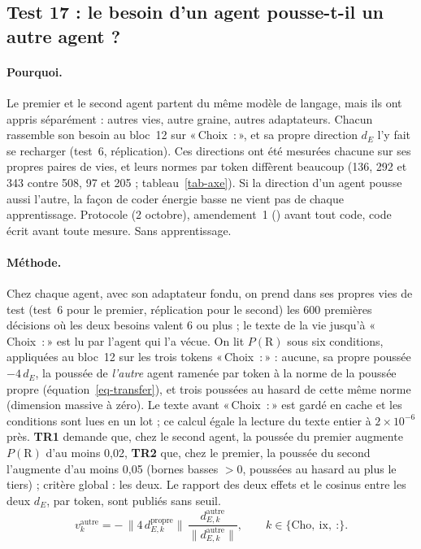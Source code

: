 \documentclass[11pt,a4paper]{article}
\newcommand{\Choix}{«\,Choix~:\,»}
\newcommand{\dE}{d_{E}}
\newcommand{\code}[1]{\texttt{\detokenize{#1}}}
\begin{document}
\subsection{Test 17 : le besoin d'un agent pousse-t-il un autre agent ?}
\label{sec-t17}

\paragraph{Pourquoi.} Le premier et le second agent partent du même modèle de langage,
mais ils ont appris séparément : autres vies, autre graine, autres adaptateurs. Chacun
rassemble son besoin au bloc~12 sur \Choix{}, et sa propre direction $\dE$ l'y fait se
recharger (test~6, réplication). Ces directions ont été mesurées chacune sur ses propres
paires de vies, et leurs normes par token diffèrent beaucoup (136, 292 et 343 contre 508,
97 et 205 ; tableau~\ref{tab-axe}). Si la direction d'un agent pousse aussi l'autre, la
façon de coder \og énergie basse \fg{} ne vient pas de chaque apprentissage. Protocole
\code{8e23605} (2 octobre), amendement~1 (\code{1b17335}) avant tout code, code
\code{334e290} écrit avant toute mesure. Sans apprentissage.

\paragraph{Méthode.} Chez chaque agent, avec son adaptateur fondu, on prend dans ses
propres vies de test (test~6 pour le premier, réplication pour le second) les 600
premières décisions où les deux besoins valent 6 ou plus ; le texte de la vie jusqu'à
\Choix{} est lu par l'agent qui l'a vécue. On lit $P(\mathrm R)$ sous six conditions,
appliquées au bloc~12 sur les trois tokens \Choix{} : aucune, sa propre poussée
$-4\,\dE$, la poussée de \emph{l'autre} agent ramenée par token à la norme de la poussée
propre (équation~\eqref{eq-transfer}), et trois poussées au hasard de cette même norme
(dimension massive à zéro). Le texte avant \Choix{} est gardé en cache et les conditions
sont lues en un lot ; ce calcul égale la lecture du texte entier à $2\times10^{-6}$ près.
\textbf{TR1} demande que, chez le second agent, la poussée du premier augmente
$P(\mathrm R)$ d'au moins 0,02, \textbf{TR2} que, chez le premier, la poussée du second
l'augmente d'au moins 0,05 (bornes basses $>0$, poussées au hasard au plus le tiers) ;
critère global : les deux. Le rapport des deux effets et le cosinus entre les deux $\dE$,
par token, sont publiés sans seuil.
\begin{equation}
v^{\text{autre}}_k=-\,\bigl\lVert 4\,d^{\text{propre}}_{E,k}\bigr\rVert\,
\frac{d^{\text{autre}}_{E,k}}{\bigl\lVert d^{\text{autre}}_{E,k}\bigr\rVert},
\qquad k\in\{\text{Cho},\ \text{ix},\ \text{:}\}.
\label{eq-transfer}
\end{equation}
\end{document}
